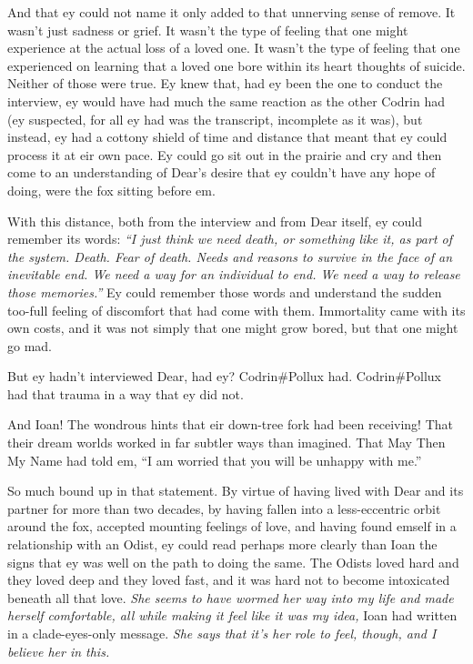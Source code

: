 And that ey could not name it only added to that unnerving sense of remove. It wasn't just sadness or grief. It wasn't the type of feeling that one might experience at the actual loss of a loved one. It wasn't the type of feeling that one experienced on learning that a loved one bore within its heart thoughts of suicide. Neither of those were true. Ey knew that, had ey been the one to conduct the interview, ey would have had much the same reaction as the other Codrin had (ey suspected, for all ey had was the transcript, incomplete as it was), but instead, ey had a cottony shield of time and distance that meant that ey could process it at eir own pace. Ey could go sit out in the prairie and cry and then come to an understanding of Dear's desire that ey couldn't have any hope of doing, were the fox sitting before em.

With this distance, both from the interview and from Dear itself, ey could remember its words: \emph{``I just think we need death, or something like it, as part of the system. Death. Fear of death. Needs and reasons to survive in the face of an inevitable end. We need a way for an individual to end. We need a way to release those memories.''} Ey could remember those words and understand the sudden too-full feeling of discomfort that had come with them. Immortality came with its own costs, and it was not simply that one might grow bored, but that one might go mad.

But ey hadn't interviewed Dear, had ey? Codrin\#Pollux had. Codrin\#Pollux had that trauma in a way that ey did not.

And Ioan! The wondrous hints that eir down-tree fork had been receiving! That their dream worlds worked in far subtler ways than imagined. That May Then My Name had told em, ``I am worried that you will be unhappy with me.''

So much bound up in that statement. By virtue of having lived with Dear and its partner for more than two decades, by having fallen into a less-eccentric orbit around the fox, accepted mounting feelings of love, and having found emself in a relationship with an Odist, ey could read perhaps more clearly than Ioan the signs that ey was well on the path to doing the same. The Odists loved hard and they loved deep and they loved fast, and it was hard not to become intoxicated beneath all that love. \emph{She seems to have wormed her way into my life and made herself comfortable, all while making it feel like it was my idea,} Ioan had written in a clade-eyes-only message. \emph{She says that it's her role to feel, though, and I believe her in this.}

